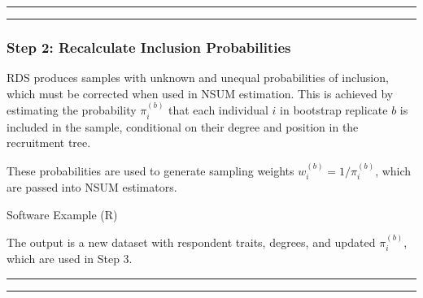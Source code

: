 \documentclass[
  12pt,
  letterpaper,
  DIV=11,
  numbers=noendperiod]{scrartcl}
\newenvironment{Shaded}{\begin{snugshade}}{\end{snugshade}}
\newcommand{\AttributeTok}[1]{\textcolor[rgb]{0.40,0.45,0.13}{#1}}
\newcommand{\DecValTok}[1]{\textcolor[rgb]{0.68,0.00,0.00}{#1}}
\newcommand{\FunctionTok}[1]{\textcolor[rgb]{0.28,0.35,0.67}{#1}}
\newcommand{\NormalTok}[1]{\textcolor[rgb]{0.00,0.23,0.31}{#1}}
\newcommand{\OtherTok}[1]{\textcolor[rgb]{0.00,0.23,0.31}{#1}}
\newcommand{\SpecialCharTok}[1]{\textcolor[rgb]{0.37,0.37,0.37}{#1}}
\newcommand{\StringTok}[1]{\textcolor[rgb]{0.13,0.47,0.30}{#1}}
\theoremstyle{plain}
\theoremstyle{definition}
\begin{document}
\begin{center}\rule{0.5\linewidth}{0.5pt}\end{center}

\begin{center}\rule{0.5\linewidth}{0.5pt}\end{center}

\subsubsection{Step 2: Recalculate Inclusion
Probabilities}\label{step-2-recalculate-inclusion-probabilities}

RDS produces samples with unknown and unequal probabilities of
inclusion, which must be corrected when used in NSUM estimation. This is
achieved by estimating the probability \(\pi_i^{(b)}\) that each
individual \(i\) in bootstrap replicate \(b\) is included in the sample,
conditional on their degree and position in the recruitment tree.

These probabilities are used to generate sampling weights
\(w_i^{(b)} = 1/\pi_i^{(b)}\), which are passed into NSUM estimators.

Software Example (R)

\begin{Shaded}
\end{Shaded}

The output is a new dataset with respondent traits, degrees, and updated
\(\pi_i^{(b)}\), which are used in Step 3.

\begin{center}\rule{0.5\linewidth}{0.5pt}\end{center}

\begin{center}\rule{0.5\linewidth}{0.5pt}\end{center}
\end{document}
